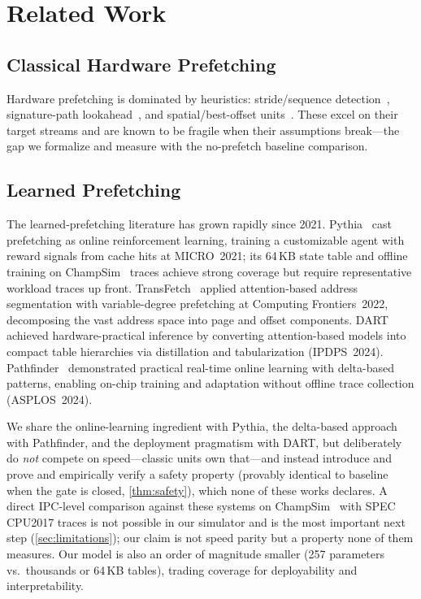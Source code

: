 \documentclass[conference]{IEEEtran}
\begin{document}
\section{Related Work}
\label{sec:related}

\subsection{Classical Hardware Prefetching}

Hardware prefetching is dominated by heuristics: stride/sequence
detection~\cite{chen1995}, signature-path lookahead~\cite{kim2016spp}, and
spatial/best-offset units~\cite{michaud2016bop}. These excel on their target streams
and are known to be fragile when their assumptions break---the gap we formalize and
measure with the no-prefetch baseline comparison.

\subsection{Learned Prefetching}

The learned-prefetching literature has grown rapidly since 2021.
Pythia~\cite{pythia} cast prefetching as online reinforcement learning,
training a customizable agent with reward signals from cache hits at MICRO~2021;
its 64\,KB state table and offline training on ChampSim~\cite{champsim} traces
achieve strong coverage but require representative workload traces up front.
TransFetch~\cite{transfetch} applied attention-based address
segmentation with variable-degree prefetching at Computing Frontiers~2022, decomposing
the vast address space into page and offset components.
DART~\cite{dart} achieved hardware-practical inference by converting
attention-based models into compact table hierarchies via distillation and
tabularization (IPDPS~2024).
Pathfinder~\cite{pathfinder} demonstrated practical real-time online learning with
delta-based patterns, enabling on-chip training and adaptation without offline
trace collection (ASPLOS~2024).

We share the online-learning ingredient with Pythia, the delta-based approach with
Pathfinder, and the deployment pragmatism with DART, but deliberately do \emph{not}
compete on speed---classic units own that---and instead introduce and
prove and empirically verify a safety property (provably identical to baseline when
the gate is closed, \cref{thm:safety}), which none of these works declares.
A direct IPC-level comparison against these systems on ChampSim~\cite{champsim} with
SPEC CPU2017 traces is not possible in our simulator and is the most important next
step (\cref{sec:limitations}); our claim is not speed parity but a property none of
them measures. Our model is also an order of magnitude smaller (257
parameters vs.\ thousands or 64\,KB tables), trading coverage for
deployability and interpretability.
\end{document}
